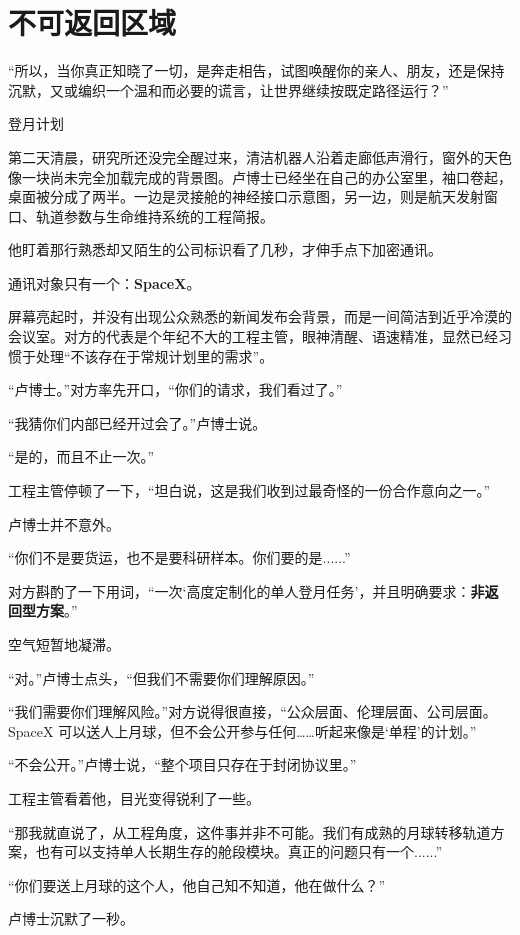 \chapter{不可返回区域}

“所以，当你真正知晓了一切，是奔走相告，试图唤醒你的亲人、朋友，还是保持沉默，又或编织一个温和而必要的谎言，让世界继续按既定路径运行？”

登月计划

第二天清晨，研究所还没完全醒过来，清洁机器人沿着走廊低声滑行，窗外的天色像一块尚未完全加载完成的背景图。卢博士已经坐在自己的办公室里，袖口卷起，桌面被分成了两半。一边是灵接舱的神经接口示意图，另一边，则是航天发射窗口、轨道参数与生命维持系统的工程简报。

他盯着那行熟悉却又陌生的公司标识看了几秒，才伸手点下加密通讯。

通讯对象只有一个：\textbf{SpaceX}。

屏幕亮起时，并没有出现公众熟悉的新闻发布会背景，而是一间简洁到近乎冷漠的会议室。对方的代表是个年纪不大的工程主管，眼神清醒、语速精准，显然已经习惯于处理“不该存在于常规计划里的需求”。

“卢博士。”对方率先开口，“你们的请求，我们看过了。”

“我猜你们内部已经开过会了。”卢博士说。

“是的，而且不止一次。”

工程主管停顿了一下，“坦白说，这是我们收到过最奇怪的一份合作意向之一。”

卢博士并不意外。

“你们不是要货运，也不是要科研样本。你们要的是......”

对方斟酌了一下用词，“一次‘高度定制化的单人登月任务’，并且明确要求：\textbf{非返回型方案}。”

空气短暂地凝滞。

“对。”卢博士点头，“但我们不需要你们理解原因。”

“我们需要你们理解风险。”对方说得很直接，“公众层面、伦理层面、公司层面。SpaceX 可以送人上月球，但不会公开参与任何……听起来像是‘单程’的计划。”

“不会公开。”卢博士说，“整个项目只存在于封闭协议里。”

工程主管看着他，目光变得锐利了一些。

“那我就直说了，从工程角度，这件事并非不可能。我们有成熟的月球转移轨道方案，也有可以支持单人长期生存的舱段模块。真正的问题只有一个......”

“你们要送上月球的这个人，他自己知不知道，他在做什么？”

卢博士沉默了一秒。

